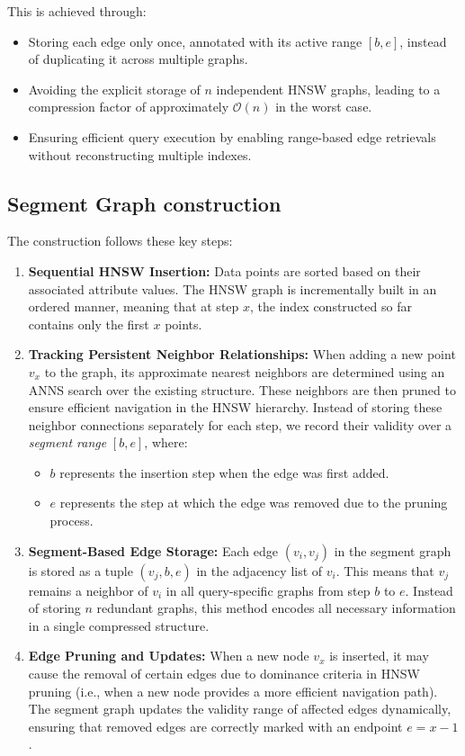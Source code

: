 This is achieved through:
\begin{itemize}
    \item Storing each edge only once, annotated with its active range $[b, e]$, instead of duplicating it across multiple graphs.
    \item Avoiding the explicit storage of $n$ independent HNSW graphs, leading to a compression factor of approximately $\mathcal{O}(n)$ in the worst case.
    \item Ensuring efficient query execution by enabling range-based edge retrievals without reconstructing multiple indexes.
\end{itemize}

\subsection{Segment Graph construction}
The construction follows these key steps:
\begin{enumerate}
    \item \textbf{Sequential HNSW Insertion:}  
    Data points are sorted based on their associated attribute values. The HNSW graph is incrementally built in an ordered manner, meaning that at step $x$, the index constructed so far contains only the first $x$ points.

    \item \textbf{Tracking Persistent Neighbor Relationships:}  
    When adding a new point $v_x$ to the graph, its approximate nearest neighbors are determined using an ANNS search over the existing structure. These neighbors are then pruned to ensure efficient navigation in the HNSW hierarchy. Instead of storing these neighbor connections separately for each step, we record their validity over a \textit{segment range} $[b, e]$, where:
    \begin{itemize}
        \item $b$ represents the insertion step when the edge was first added.
        \item $e$ represents the step at which the edge was removed due to the pruning process.
    \end{itemize}
    
    \item \textbf{Segment-Based Edge Storage:}  
    Each edge $(v_i, v_j)$ in the segment graph is stored as a tuple $(v_j, b, e)$ in the adjacency list of $v_i$. This means that $v_j$ remains a neighbor of $v_i$ in all query-specific graphs from step $b$ to $e$. Instead of storing $n$ redundant graphs, this method encodes all necessary information in a single compressed structure.

    \item \textbf{Edge Pruning and Updates:}  
    When a new node $v_x$ is inserted, it may cause the removal of certain edges due to dominance criteria in HNSW pruning (i.e., when a new node provides a more efficient navigation path). The segment graph updates the validity range of affected edges dynamically, ensuring that removed edges are correctly marked with an endpoint $e = x - 1$.
\end{enumerate}


